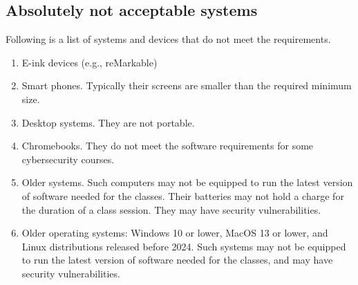 \newpage\subsection*{Absolutely not acceptable systems}

Following is a list of systems and devices that do not meet the requirements.

\begin{enumerate}
    \item E-ink devices (e.g., reMarkable)
    \item Smart phones. Typically their screens are smaller than the required minimum size.
    \item Desktop systems. They are not portable.
    \item Chromebooks. They do not meet the software requirements for some cybersecurity courses.
    \item Older systems. Such computers may not be equipped to run the latest version of software needed for the classes. Their batteries may not hold a charge for the duration of a class session. They may have security vulnerabilities.
    \item Older operating systems: Windows 10 or lower, MacOS 13 or lower, and Linux distributions released before 2024. Such systems may not be equipped to run the latest version of software needed for the classes, and may have security vulnerabilities.
\end{enumerate}
